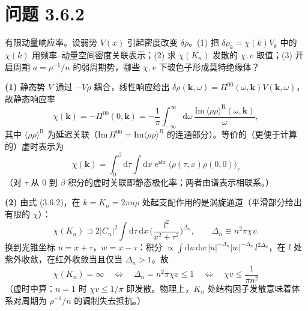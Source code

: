 \section*{问题 3.6.2}
\begin{problem}
有限动量响应率。设弱势 $V(x)$ 引起密度改变 $\delta\rho$。(1) 把 $\delta\rho_k=\chi(k)V_k$ 中的 $\chi(k)$ 用频率--动量空间密度关联表示；(2) 求 $\chi(K_n)$ 发散的 $\chi,v$ 取值；(3) 开启周期 $a=\rho^{-1}/n$ 的弱周期势，哪些 $\chi,v$ 下玻色子形成莫特绝缘体？
\end{problem}
\solution

\textbf{(1)} 静态势 $V$ 通过 $-V\rho$ 耦合，线性响应给出 $\delta\rho(\pmb{k},\omega)=\Pi^{00}(\omega,\pmb{k})V(\pmb{k},\omega)$，故静态响应率
\begin{equation*}
\chi(\pmb{k})=-\Pi^{00}(0,\pmb{k})
=-\frac{1}{\pi}\int_{-\infty}^{\infty}\mathrm{d}\omega\,
\frac{\mathrm{Im}\,\langle\rho\rho\rangle^{\mathrm{R}}(\omega,\pmb{k})}{\omega} ,
\end{equation*}
其中 $\langle\rho\rho\rangle^{\mathrm{R}}$ 为延迟关联（$\mathrm{Im}\,\Pi^{00}=\mathrm{Im}\langle\rho\rho\rangle^{R}$ 的连通部分）。等价的（更便于计算的）虚时表示为
\begin{equation*}
\boxed{\;\chi(\pmb{k})=\int_{0}^{\beta}\mathrm{d}\tau\int\mathrm{d}x\;
\mathrm{e}^{\mathrm{i}kx}\,
\big\langle\rho(\tau,x)\rho(0,0)\big\rangle_{c}\;}
\end{equation*}
（对 $\tau$ 从 $0$ 到 $\beta$ 积分的虚时关联即静态极化率；两者由谱表示相联系。）

\textbf{(2)} 由式 (3.6.2)，在 $k=K_n=2\pi n\rho$ 处起支配作用的是涡旋通道（平滑部分给出有限的 $\chi$）：
\begin{equation*}
\chi(K_n)\supset2|C_n|^{2}\int\mathrm{d}\tau\,\mathrm{d}x\,
\Big(\frac{l^{2}}{x^{2}+\tau^{2}}\Big)^{\Delta_n},
\qquad \Delta_n\equiv n^{2}\pi\chi v .
\end{equation*}
换到光锥坐标 $u=x+\tau$，$w=x-\tau$：积分 $\propto\int\mathrm{d}u\,\mathrm{d}w\,|u|^{-\Delta_n}|w|^{-\Delta_n}\,l^{2\Delta_n}$，在 $l$ 处紫外收敛，在红外收敛当且仅当 $\Delta_n>1$。故
\begin{equation*}
\boxed{\;\chi(K_n)=\infty\quad\Longleftrightarrow\quad
\Delta_n=n^{2}\pi\chi v\le1
\quad\Longleftrightarrow\quad
\chi v\le\frac{1}{\pi n^{2}}\;}
\end{equation*}
（虚时中算：$n=1$ 时 $\chi v\le1/\pi$ 即发散。物理上，$K_n$ 处结构因子发散意味着体系对周期为 $\rho^{-1}/n$ 的调制失去抵抗。）

